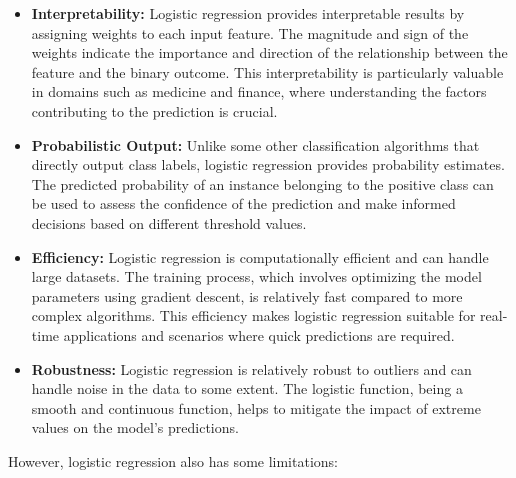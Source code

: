 \documentclass[letterpaper,10pt]{article}
\begin{document}
\begin{itemize}
  \item \textbf{Interpretability:} Logistic regression provides interpretable results by assigning weights to each input feature. The magnitude and sign of the weights indicate the importance and direction of the relationship between the feature and the binary outcome. This interpretability is particularly valuable in domains such as medicine and finance, where understanding the factors contributing to the prediction is crucial.

  \item \textbf{Probabilistic Output:} Unlike some other classification algorithms that directly output class labels, logistic regression provides probability estimates. The predicted probability of an instance belonging to the positive class can be used to assess the confidence of the prediction and make informed decisions based on different threshold values.

  \item \textbf{Efficiency:} Logistic regression is computationally efficient and can handle large datasets. The training process, which involves optimizing the model parameters using gradient descent, is relatively fast compared to more complex algorithms. This efficiency makes logistic regression suitable for real-time applications and scenarios where quick predictions are required.

  \item \textbf{Robustness:} Logistic regression is relatively robust to outliers and can handle noise in the data to some extent. The logistic function, being a smooth and continuous function, helps to mitigate the impact of extreme values on the model's predictions.
\end{itemize}

However, logistic regression also has some limitations:
\end{document}
